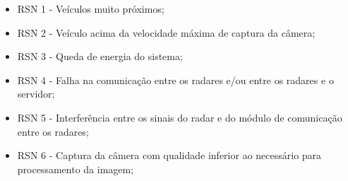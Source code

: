 \begin{itemize}

	\item RSN 1 - Veículos muito próximos;
	\item RSN 2 - Veículo acima da velocidade máxima de captura da câmera;
	\item RSN 3 - Queda de energia do sistema;
	\item RSN 4 - Falha na comunicação entre os radares e/ou entre os radares e o servidor;
	\item RSN 5 - Interferência entre os sinais do radar e do módulo de comunicação entre os radares;
	\item RSN 6 - Captura da câmera com qualidade inferior ao necessário para processamento da imagem;
	
\end{itemize} 	

